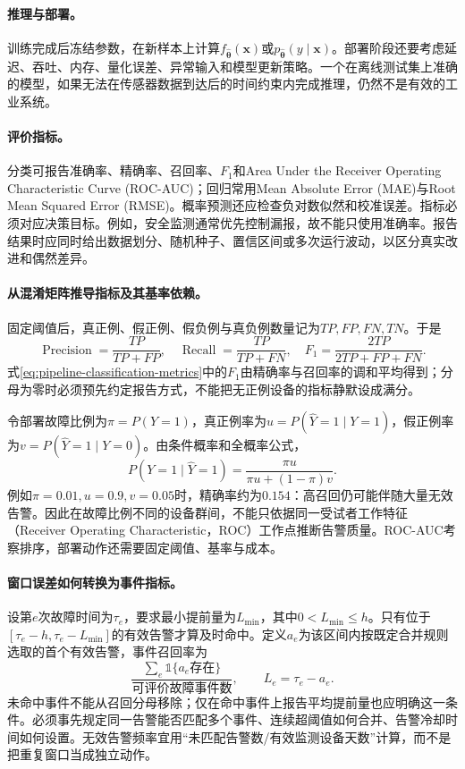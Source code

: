 \paragraph{推理与部署。}
训练完成后冻结参数，在新样本上计算$f_{\hat{\bm{\theta}}}(\bm{x})$或$p_{\hat{\bm{\theta}}}(y\mid\bm{x})$。部署阶段还要考虑延迟、吞吐、内存、量化误差、异常输入和模型更新策略。一个在离线测试集上准确的模型，如果无法在传感器数据到达后的时间约束内完成推理，仍然不是有效的工业系统。

\paragraph{评价指标。}
分类可报告准确率、精确率、召回率、$F_1$和Area Under the Receiver Operating Characteristic Curve (ROC-AUC)；回归常用Mean Absolute Error (MAE)与Root Mean Squared Error (RMSE)。概率预测还应检查负对数似然和校准误差。指标必须对应决策目标。例如，安全监测通常优先控制漏报，故不能只使用准确率。报告结果时应同时给出数据划分、随机种子、置信区间或多次运行波动，以区分真实改进和偶然差异。

\paragraph{从混淆矩阵推导指标及其基率依赖。}
固定阈值后，真正例、假正例、假负例与真负例数量记为$TP,FP,FN,TN$。于是
\begin{equation}
 \operatorname{Precision}=\frac{TP}{TP+FP},\quad
 \operatorname{Recall}=\frac{TP}{TP+FN},\quad
 F_1=\frac{2TP}{2TP+FP+FN}.\label{eq:pipeline-classification-metrics}
\end{equation}
式\eqref{eq:pipeline-classification-metrics}中的$F_1$由精确率与召回率的调和平均得到；分母为零时必须预先约定报告方式，不能把无正例设备的指标静默设成满分。

令部署故障比例为$\pi=P(Y=1)$，真正例率为$u=P(\hat Y=1\mid Y=1)$，假正例率为$v=P(\hat Y=1\mid Y=0)$。由条件概率和全概率公式，
\begin{equation}
 P(Y=1\mid\hat Y=1)=\frac{\pi u}{\pi u+(1-\pi)v}.
\end{equation}
例如$\pi=0.01,u=0.9,v=0.05$时，精确率约为$0.154$：高召回仍可能伴随大量无效告警。因此在故障比例不同的设备群间，不能只依据同一受试者工作特征（Receiver Operating Characteristic，ROC）工作点推断告警质量。ROC-AUC考察排序，部署动作还需要固定阈值、基率与成本。

\paragraph{窗口误差如何转换为事件指标。}
设第$e$次故障时间为$\tau_e$，要求最小提前量为$L_{\min}$，其中$0<L_{\min}\leq h$。只有位于$[\tau_e-h,\tau_e-L_{\min}]$的有效告警才算及时命中。定义$a_e$为该区间内按既定合并规则选取的首个有效告警，事件召回率为
\begin{equation}
 \frac{\sum_e\mathbb1\{a_e\text{存在}\}}{\text{可评价故障事件数}},\qquad
 L_e=\tau_e-a_e.
\end{equation}
未命中事件不能从召回分母移除；仅在命中事件上报告平均提前量也应明确这一条件。必须事先规定同一告警能否匹配多个事件、连续超阈值如何合并、告警冷却时间如何设置。无效告警频率宜用“未匹配告警数/有效监测设备天数”计算，而不是把重复窗口当成独立动作。

